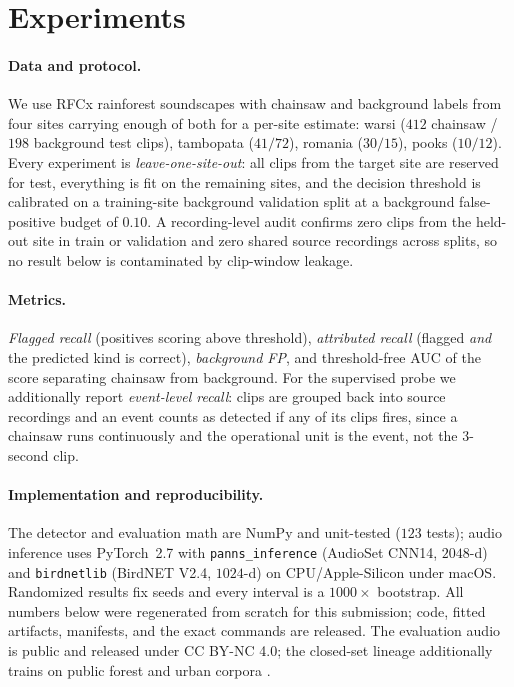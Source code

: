 \section{Experiments}
\label{sec:experiments}

\paragraph{Data and protocol.} We use RFCx rainforest soundscapes
\citep{rfcx_frugalai} with chainsaw and background labels from four sites carrying enough of both for a per-site
estimate: warsi ($412$ chainsaw / $198$ background test clips), tambopata
($41/72$), romania ($30/15$), pooks ($10/12$). Every experiment is
\emph{leave-one-site-out}: all clips from the target site are reserved for test,
everything is fit on the remaining sites, and the decision threshold is
calibrated on a training-site background validation split at a background
false-positive budget of $0.10$. A recording-level audit confirms zero clips from
the held-out site in train or validation and zero shared source recordings across
splits, so no result below is contaminated by clip-window leakage.

\paragraph{Metrics.} \emph{Flagged recall} (positives scoring above threshold),
\emph{attributed recall} (flagged \emph{and} the predicted kind is correct),
\emph{background FP}, and threshold-free AUC of the score separating chainsaw
from background. For the supervised probe we additionally report
\emph{event-level recall}: clips are grouped back into source recordings and an
event counts as detected if any of its clips fires, since a chainsaw runs
continuously and the operational unit is the event, not the $3$-second clip.

\paragraph{Implementation and reproducibility.} The detector and evaluation math
are NumPy and unit-tested ($123$ tests); audio inference uses PyTorch~2.7 with
\texttt{panns\_inference} (AudioSet CNN14, $2048$-d) and \texttt{birdnetlib}
(BirdNET V2.4, $1024$-d) on CPU/Apple-Silicon under macOS. Randomized results fix
seeds and every interval is a $1000\times$ bootstrap. All numbers below were
regenerated from scratch for this submission; code, fitted artifacts, manifests,
and the exact commands are released. The evaluation audio is public and released
under CC BY-NC 4.0; the closed-set lineage additionally trains on public forest
and urban corpora \citep{bandara2023fsc22,gemmeke2017audioset}.

